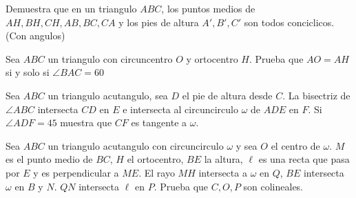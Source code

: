 \documentclass[11pt]{scrartcl}
\newcommand{\gad}{\textcolor{yellow}{$\bigstar$}}
\newcommand{\thmdifficulty}{0}
\newcommand{\problemdiff}[1]{\renewcommand{\thmdifficulty}{#1}}
\begin{document}
\problemdiff{3.5}
\begin{problema} [9 puntos]
    Demuestra que en un triangulo $ABC$, los puntos medios de $AH,BH,CH,AB,BC,CA$ y los pies de altura $A',B',C'$ son todos conciclicos. (Con angulos)
\end{problema}


\problemdiff{4}
\begin{problema} [OTIS]
Sea $ABC$ un triangulo con circuncentro $O$ y ortocentro $H$. Prueba que $AO=AH$ si y solo si $\angle BAC=60$
\end{problema}




\problemdiff{5}
\begin{problema} [\gad]
    Sea $ABC$ un triangulo acutangulo, sea $D$ el pie de altura desde $C$. La bisectriz de $\angle ABC$ intersecta $CD$ en $E$ e intersecta al circuncirculo $\omega$ de $ADE$ en $F$. Si $\angle ADF=45$ muestra que $CF$ es tangente a $\omega$.
\end{problema}

\problemdiff{5}
\begin{problema}[AoPS] %
    Sea $ABC$ un triangulo acutangulo con circuncirculo $\omega$ y sea $O$ el centro de $\omega$. $M$ es el punto medio de $BC$, $H$ el ortocentro, $BE$ la altura, $\ell$ es una recta que pasa por $E$
    y es perpendicular a $ME$. El rayo $MH$ intersecta a $\omega$ en $Q$, $BE$ intersecta $\omega$ en $B$ y $N$. $QN$ intersecta $\ell$ en $P$. Prueba que $C,O,P$ son colineales.
\end{problema}
\end{document}
